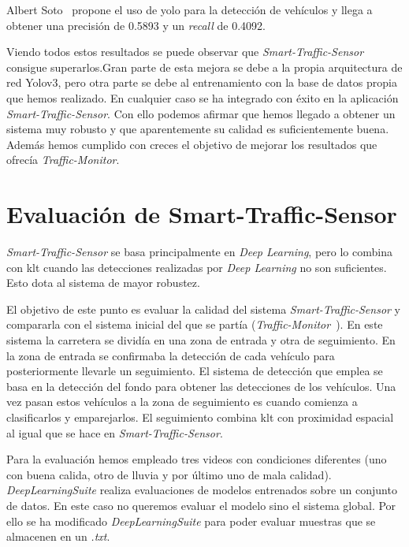 Albert Soto~\cite{albert_soto} propone el uso de \acrshort{yolo} para la detección de vehículos y llega a obtener una precisión de 0.5893 y un  \textit{recall} de 0.4092.


Viendo todos estos resultados se puede observar que \textit{Smart-Traffic-Sensor} consigue superarlos.Gran parte de esta mejora se debe a la propia arquitectura de red Yolov3, pero otra parte se debe al entrenamiento con la base de datos propia que hemos realizado. En cualquier caso se ha integrado con éxito en la aplicación \textit{Smart-Traffic-Sensor}. Con ello podemos afirmar que hemos llegado a obtener un sistema muy robusto y que aparentemente su calidad es suficientemente buena. Además hemos cumplido con creces el objetivo de mejorar los resultados que ofrecía \textit{Traffic-Monitor}. 

\section{Evaluación de Smart-Traffic-Sensor}

\textit{Smart-Traffic-Sensor} se basa principalmente en \textit{Deep Learning}, pero lo combina con \acrshort{klt} cuando las detecciones realizadas por \textit{Deep Learning} no son suficientes. Esto dota al sistema de mayor robustez. 

El objetivo de este punto es evaluar la calidad del sistema \textit{Smart-Traffic-Sensor} y compararla con el sistema inicial del que se partía (\textit{Traffic-Monitor}~\cite{redo_tesis}). En este sistema la carretera se dividía en una zona de entrada y otra de seguimiento. En la zona de entrada se confirmaba la detección de cada vehículo para posteriormente llevarle un seguimiento.  El sistema de detección que emplea se  basa en la detección del fondo para obtener las detecciones de los vehículos. Una vez pasan estos vehículos a la zona de seguimiento es cuando comienza a clasificarlos y emparejarlos. El seguimiento combina \acrshort{klt} con proximidad espacial al igual que se hace en \textit{Smart-Traffic-Sensor}.

Para la evaluación hemos empleado tres videos con condiciones diferentes (uno con buena calida, otro de lluvia y por último uno de mala calidad). \textit{DeepLearningSuite} realiza evaluaciones de modelos entrenados sobre un conjunto de datos. En este caso no queremos evaluar el modelo sino el sistema global. Por ello se ha modificado \textit{DeepLearningSuite} para poder evaluar muestras que se almacenen en un \textit{.txt}. 

